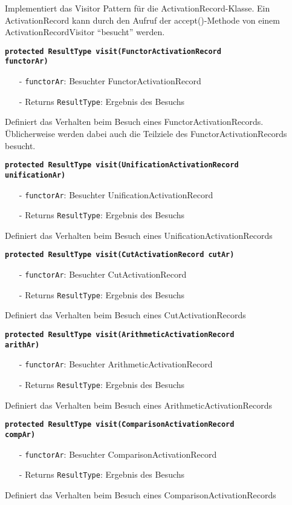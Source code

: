 \documentclass[parskip=full,11pt,twoside]{scrartcl}
\begin{document}
Implementiert das Visitor Pattern für die ActivationRecord-Klasse. Ein ActivationRecord kann durch den Aufruf der accept()-Methode von einem ActivationRecordVisitor \enquote{besucht} werden.

\textbf{\texttt{protected ResultType visit(FunctorActivationRecord\\functorAr)}}
\begin{itemize}[noitemsep]
	\item[-] \texttt{functorAr}: Besuchter FunctorActivationRecord
	\item[-] Returns \texttt{ResultType}: Ergebnis des Besuchs
\end{itemize}
Definiert das Verhalten beim Besuch eines FunctorActivationRecords. Üblicherweise werden dabei auch die Teilziele des FunctorActivationRecords besucht.

\textbf{\texttt{protected ResultType visit(UnificationActivationRecord\\unificationAr)}}
\begin{itemize}[noitemsep]
	\item[-] \texttt{functorAr}: Besuchter UnificationActivationRecord
	\item[-] Returns \texttt{ResultType}: Ergebnis des Besuchs
\end{itemize}
Definiert das Verhalten beim Besuch eines UnificationActivationRecords

\textbf{\texttt{protected ResultType visit(CutActivationRecord cutAr)}}
\begin{itemize}[noitemsep]
	\item[-] \texttt{functorAr}: Besuchter CutActivationRecord
	\item[-] Returns \texttt{ResultType}: Ergebnis des Besuchs
\end{itemize}
Definiert das Verhalten beim Besuch eines CutActivationRecords

\textbf{\texttt{protected ResultType visit(ArithmeticActivationRecord\\arithAr)}}
\begin{itemize}[noitemsep]
	\item[-] \texttt{functorAr}: Besuchter ArithmeticActivationRecord
	\item[-] Returns \texttt{ResultType}: Ergebnis des Besuchs
\end{itemize}
Definiert das Verhalten beim Besuch eines ArithmeticActivationRecords

\textbf{\texttt{protected ResultType visit(ComparisonActivationRecord\\compAr)}}
\begin{itemize}[noitemsep]
	\item[-] \texttt{functorAr}: Besuchter ComparisonActivationRecord
	\item[-] Returns \texttt{ResultType}: Ergebnis des Besuchs
\end{itemize}
Definiert das Verhalten beim Besuch eines ComparisonActivationRecords
\end{document}
